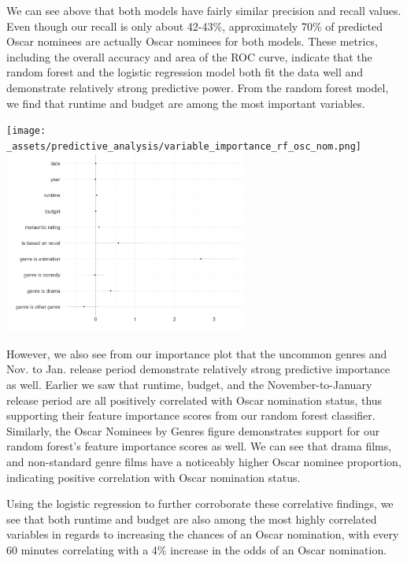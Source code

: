 \documentclass[10pt]{article}
\begin{document}


We can see above that both models have fairly similar precision and recall values. Even though our recall is only about 42-43\%, approximately 70\% of predicted Oscar nominees are actually Oscar nominees for both models. These metrics, including the overall accuracy and area of the ROC curve, indicate that the random forest and the logistic regression model both fit the data well and demonstrate relatively strong predictive power. From the random forest model, we find that runtime and budget are among the most important variables.

\begin{center}
\texttt{[image: \_assets/predictive\_analysis/variable\_importance\_rf\_osc\_nom.png]}
\hspace{1cm}
\includegraphics[width=8cm]{_assets/log-reg-plots/dwplot.png}
\end{center}

However, we also see from our importance plot that the uncommon genres and Nov. to Jan. release period demonstrate relatively strong predictive importance as well. Earlier we saw that runtime, budget, and the November-to-January release period are all positively correlated with Oscar nomination status, thus supporting their feature importance scores from our random forest classifier. Similarly, the Oscar Nominees by Genres figure demonstrates support for our random forest’s feature importance scores as well. We can see that drama films, and non-standard genre films have a noticeably higher Oscar nominee proportion, indicating positive correlation with Oscar nomination status. 

Using the logistic regression to further corroborate these correlative findings, we see that both runtime and budget are also among the most highly correlated variables in regards to increasing the chances of an Oscar nomination, with every 60 minutes correlating with a 4\% increase in the odds of an Oscar nomination. 
\end{document}
